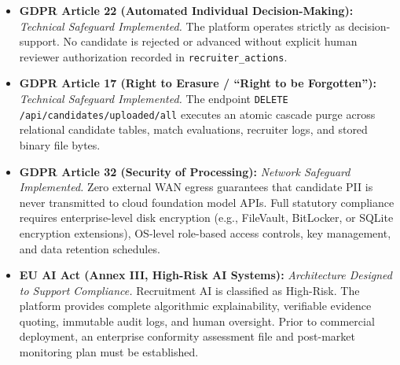 \documentclass[11pt,a4paper]{report}
\begin{document}
\begin{itemize}[leftmargin=1.5em]
    \item \textbf{GDPR Article 22 (Automated Individual Decision-Making):} \emph{Technical Safeguard Implemented.} The platform operates strictly as decision-support. No candidate is rejected or advanced without explicit human reviewer authorization recorded in \texttt{recruiter\_actions}.
    \item \textbf{GDPR Article 17 (Right to Erasure / ``Right to be Forgotten''):} \emph{Technical Safeguard Implemented.} The endpoint \texttt{DELETE /api/candidates/uploaded/all} executes an atomic cascade purge across relational candidate tables, match evaluations, recruiter logs, and stored binary file bytes.
    \item \textbf{GDPR Article 32 (Security of Processing):} \emph{Network Safeguard Implemented.} Zero external WAN egress guarantees that candidate PII is never transmitted to cloud foundation model APIs. Full statutory compliance requires enterprise-level disk encryption (e.g., FileVault, BitLocker, or SQLite encryption extensions), OS-level role-based access controls, key management, and data retention schedules.
    \item \textbf{EU AI Act (Annex III, High-Risk AI Systems):} \emph{Architecture Designed to Support Compliance.} Recruitment AI is classified as High-Risk. The platform provides complete algorithmic explainability, verifiable evidence quoting, immutable audit logs, and human oversight. Prior to commercial deployment, an enterprise conformity assessment file and post-market monitoring plan must be established.
\end{itemize}
\end{document}
